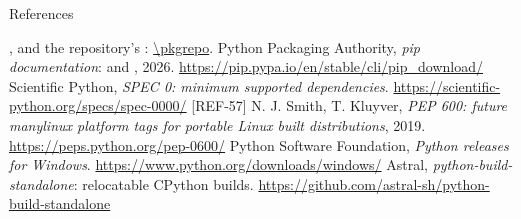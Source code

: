 \documentclass[aspectratio=169,11pt]{beamer}
\begin{document}
\begin{frame}{References}
\begin{reflist}
   , and the repository's
        : \url{\pkgrepo}.
   Python Packaging Authority, \emph{pip documentation}:  and , 2026.
        \url{https://pip.pypa.io/en/stable/cli/pip_download/}
   Scientific Python, \emph{SPEC 0: minimum supported dependencies}.
        \url{https://scientific-python.org/specs/spec-0000/}
   [REF-57] N. J. Smith, T. Kluyver, \emph{PEP 600: future manylinux platform
        tags for portable Linux built distributions}, 2019.
        \url{https://peps.python.org/pep-0600/}
   Python Software Foundation, \emph{Python releases for Windows}.
        \url{https://www.python.org/downloads/windows/}
   Astral, \emph{python-build-standalone}: relocatable CPython builds.
        \url{https://github.com/astral-sh/python-build-standalone}
\end{reflist}
\end{frame}
\end{document}
